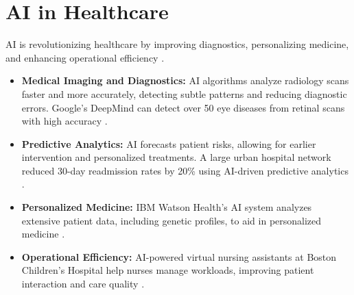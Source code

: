 \section{AI in Healthcare}
AI is revolutionizing healthcare by improving diagnostics, personalizing medicine, and enhancing operational efficiency \parencite{scimedian.in}.
\begin{itemize}
    \item \textbf{Medical Imaging and Diagnostics:} AI algorithms analyze radiology scans faster and more accurately, detecting subtle patterns and reducing diagnostic errors. Google's DeepMind can detect over 50 eye diseases from retinal scans with high accuracy \parencite{scimedian.in}.
    \item \textbf{Predictive Analytics:} AI forecasts patient risks, allowing for earlier intervention and personalized treatments. A large urban hospital network reduced 30-day readmission rates by 20\% using AI-driven predictive analytics \parencite{tezeract.ai}.
    \item \textbf{Personalized Medicine:} IBM Watson Health's AI system analyzes extensive patient data, including genetic profiles, to aid in personalized medicine \parencite{scimedian.in}.
    \item \textbf{Operational Efficiency:} AI-powered virtual nursing assistants at Boston Children's Hospital help nurses manage workloads, improving patient interaction and care quality \parencite{designveloper.com}.
\end{itemize}

